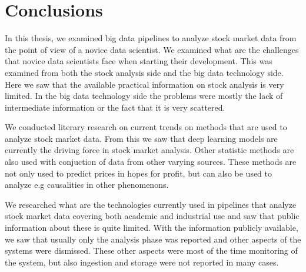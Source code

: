 \chapter{Conclusions}
\label{chapter:conclusions}



In this thesis, we examined big data pipelines to analyze stock market data from the point of view of a novice data scientist.
We examined what are the challenges that novice data scientists face when starting their development.
This was examined from both the stock analysis side and the big data technology side.
Here we saw that the available practical information on stock analysis is very limited.
In the big data technology side the problems were mostly the lack of intermediate information or the fact that it is very scattered.

We conducted literary research on current trends on methods that are used to analyze stock market data.
From this we saw that deep learning models are currently the driving force in stock market analysis.
Other statistic methods are also used with conjuction of data from other varying sources.
These methods are not only used to predict prices in hopes for profit, but can also be used to analyze e.g causalities in other phenomenons.

We researched what are the technologies currently used in pipelines that analyze stock market data covering both academic and industrial use and saw that public information about these is quite limited.
With the information publicly available, we saw that usually only the analysis phase was reported and other aspects of the systems were dismissed.
These other aspects were most of the time monitoring of the system, but also ingestion and storage were not reported in many cases.

